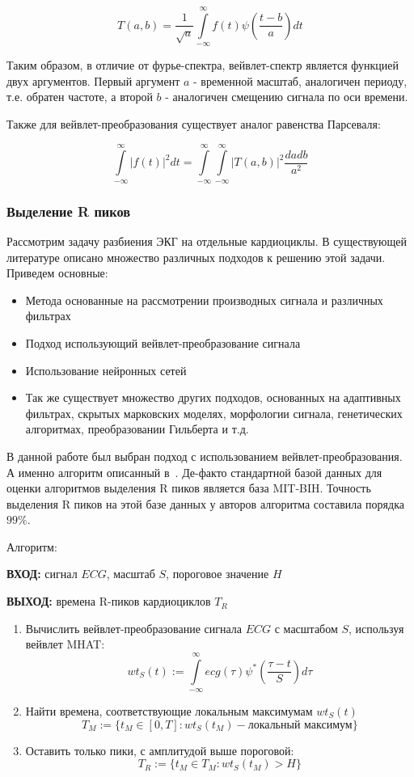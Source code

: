 \documentclass[a4paper,12pt]{extarticle}
\begin{document}
$$ T(a,b) = \frac{1}{\sqrt{a}} \int\limits_{-\infty}^{\infty} f(t) \psi(\frac{t-b}{a}) dt $$

Таким образом, в отличие от фурье-спектра, вейвлет-спектр является функцией двух аргументов. Первый аргумент $a$ - временной масштаб, аналогичен периоду, т.е. обратен частоте, а второй $b$ - аналогичен смещению сигнала по оси времени.

Также для вейвлет-преобразования существует аналог равенства Парсеваля:

$$ \int\limits_{-\infty}^{\infty} |f(t)|^2 dt = \int\limits_{-\infty}^{\infty} \int\limits_{-\infty}^{\infty} |T(a,b)|^2 \frac{da db}{a^2} $$

\subsubsection{Выделение R пиков}
\label{sssec:RPeaksDetectionTheory}
Рассмотрим задачу разбиения ЭКГ на отдельные кардиоциклы. В существующей литературе описано множество различных подходов к решению этой задачи\cite{Kohler2002}. Приведем основные:

\begin{itemize}
    \item Метода основанные на рассмотрении производных сигнала и различных фильтрах
    \item Подход использующий вейвлет-преобразование сигнала
    \item Использование нейронных сетей
    \item Так же существует множество других подходов, основанных на адаптивных фильтрах, скрытых марковских моделях, морфологии сигнала, генетических алгоритмах, преобразовании Гильберта и т.д.
\end{itemize}

В данной работе был выбран подход с использованием вейвлет-преобразования. А именно алгоритм описанный в~\cite{Chen2009,ApplWTTWave04}. Де-факто стандартной базой данных для оценки алгоритмов выделения R пиков является база MIT-BIH\cite{PhysioNet}. Точность выделения R пиков на этой базе данных у авторов алгоритма составила порядка $99\%$.

Алгоритм:


\textbf{ВХОД:} сигнал $ECG$, масштаб $S$, пороговое значение $H$


\textbf{ВЫХОД:} времена R-пиков кардиоциклов $T_R$
\begin{enumerate}
    \item Вычислить вейвлет-преобразование сигнала $ECG$ с масштабом $S$, используя вейвлет MHAT:
    $$ wt_{S}(t) := \int\limits_{-\infty}^{\infty} ecg(\tau) \psi^*(\frac{\tau-t}{S})d\tau$$
    \item Найти времена, соответствующие локальным максимумам $wt_{S}(t)$
    $$ T_M := \{t_M \in [0, T]: wt_{S}(t_M) - \text{локальный максимум}\} $$
    \item Оставить только пики, с амплитудой выше пороговой:
    $$ T_R := \{t_M \in T_M: wt_{S}(t_M) > H\} $$
\end{enumerate}
\end{document}

